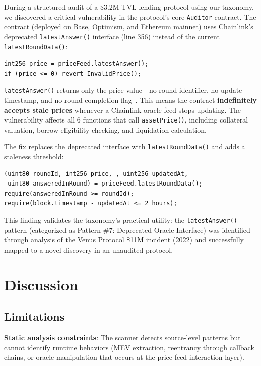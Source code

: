 \documentclass[runningheads]{llncs}
\begin{document}
During a structured audit of a \$3.2M TVL lending protocol using our taxonomy, we discovered a critical vulnerability in the protocol's core \texttt{Auditor} contract. The contract (deployed on Base, Optimism, and Ethereum mainnet) uses Chainlink's deprecated \texttt{latestAnswer()} interface (line 356) instead of the current \texttt{latestRoundData()}:

\begin{verbatim}
int256 price = priceFeed.latestAnswer();
if (price <= 0) revert InvalidPrice();
\end{verbatim}

\texttt{latestAnswer()} returns only the price value—no round identifier, no update timestamp, and no round completion flag~\cite{chainlink}. This means the contract \textbf{indefinitely accepts stale prices} whenever a Chainlink oracle feed stops updating. The vulnerability affects all 6 functions that call \texttt{assetPrice()}, including collateral valuation, borrow eligibility checking, and liquidation calculation.

The fix replaces the deprecated interface with \texttt{latestRoundData()} and adds a staleness threshold:

\begin{verbatim}
(uint80 roundId, int256 price, , uint256 updatedAt, 
 uint80 answeredInRound) = priceFeed.latestRoundData();
require(answeredInRound >= roundId);
require(block.timestamp - updatedAt <= 2 hours);
\end{verbatim}

This finding validates the taxonomy's practical utility: the \texttt{latestAnswer()} pattern (categorized as Pattern \#7: Deprecated Oracle Interface) was identified through analysis of the Venus Protocol \$11M incident (2022) and successfully mapped to a novel discovery in an unaudited protocol.

\section{Discussion}

\subsection{Limitations}

\textbf{Static analysis constraints}: The scanner detects source-level patterns but cannot identify runtime behaviors (MEV extraction, reentrancy through callback chains, or oracle manipulation that occurs at the price feed interaction layer).
\end{document}

